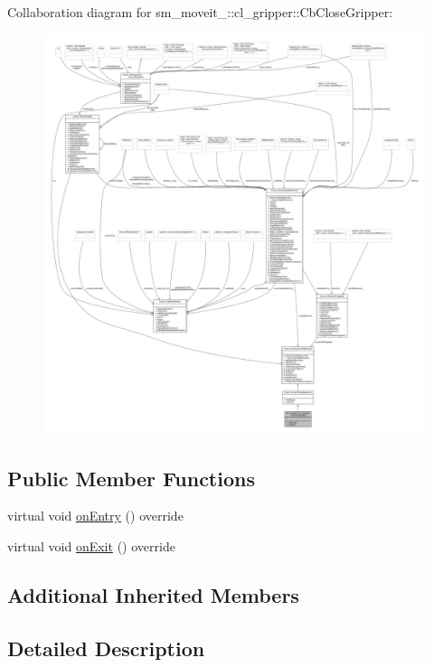 Collaboration diagram for sm\+\_\+moveit\+\_\+:\+:cl\+\_\+gripper\+:\+:Cb\+Close\+Gripper\+:
\nopagebreak
\begin{figure}[H]
\begin{center}
\leavevmode
\includegraphics[width=350pt]{classsm__moveit__3_1_1cl__gripper_1_1CbCloseGripper__coll__graph}
\end{center}
\end{figure}
\subsection*{Public Member Functions}
\begin{DoxyCompactItemize}
\item 
virtual void \hyperlink{classsm__moveit__3_1_1cl__gripper_1_1CbCloseGripper_afb060027abdf32de5c2d0e400c257228}{on\+Entry} () override
\item 
virtual void \hyperlink{classsm__moveit__3_1_1cl__gripper_1_1CbCloseGripper_ad78af2da289e83bd9a7087bc31b14ecb}{on\+Exit} () override
\end{DoxyCompactItemize}
\subsection*{Additional Inherited Members}


\subsection{Detailed Description}


